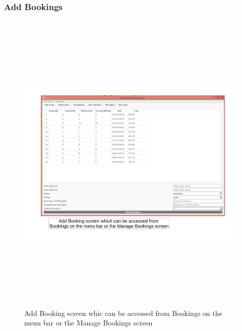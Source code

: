 \begin{landscape}
\subsubsection{Add Bookings}
\begin{figure}[H]
    \includegraphics[height = 15cm]{./Maintenance/images/screen3}
    \caption{Add Booking screen whic can be accessed from Bookings on the menu bar or the Manage Bookings screen} \label{fig:screen3}
\end{figure}


\end{landscape}
